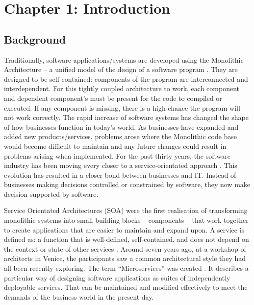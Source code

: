 \section{Chapter 1: Introduction}
	\subsection{Background}
	Traditionally, software applications/systems are developed using the Monolithic Architecture – a unified model of the design of a software program \cite{MonolithMargaret}. They are designed to be self-contained: components of the program are interconnected and interdependent. 
	For this tightly coupled architecture to work, each component and dependent component’s must be present for the code to compiled or executed. If any component is missing, there is a high chance the program will not work correctly.
	The rapid increase of software systems has changed the shape of how businesses function in today’s world. As businesses have expanded and added new products/services, problems arose where the Monolithic code base would become difficult to maintain and any future changes could result in problems arising when implemented.
	For the past thirty years, the software industry has been moving every closer to a service-orientated approach \cite{SoADummies}. This evolution has resulted in a closer bond between businesses and IT. Instead of businesses making decisions controlled or constrained by software, they now make decision supported by software. 
	
	Service Orientated Architectures (SOA) were the first realisation of transforming monolithic systems into small building blocks – components – that work together to create applications that are easier to maintain and expand upon. A service is defined as: a function that is well-defined, self-contained, and does not depend on the context or state of other services \cite{ServiceArchiBarry}.
	Around seven years ago, at a workshop of architects in Venice, the participants saw a common architectural style they had all been recently exploring. The term “Microservices” was created \cite{MartinFowlersite}. It describes a particular way of designing software applications as suites of independently deployable services. That can be maintained and modified effectively to meet the demands of the business world in the present day.
	
